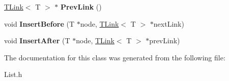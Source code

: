 \begin{DoxyCompactItemize}
\item 
\hypertarget{class_t_link_ae6f2c9f1ceaed42ffab535ed12d78088}{\hyperlink{class_t_link}{T\-Link}$<$ T $>$ $\ast$ {\bfseries Prev\-Link} ()}\label{class_t_link_ae6f2c9f1ceaed42ffab535ed12d78088}

\item 
\hypertarget{class_t_link_a24c6e9c3d7689fa7616ce8765658bfb1}{void {\bfseries Insert\-Before} (T $\ast$node, \hyperlink{class_t_link}{T\-Link}$<$ T $>$ $\ast$next\-Link)}\label{class_t_link_a24c6e9c3d7689fa7616ce8765658bfb1}

\item 
\hypertarget{class_t_link_af2d24026f2beae7d09b32976d72fbc91}{void {\bfseries Insert\-After} (T $\ast$node, \hyperlink{class_t_link}{T\-Link}$<$ T $>$ $\ast$prev\-Link)}\label{class_t_link_af2d24026f2beae7d09b32976d72fbc91}

\end{DoxyCompactItemize}


The documentation for this class was generated from the following file\-:\begin{DoxyCompactItemize}
\item 
List.\-h\end{DoxyCompactItemize}
